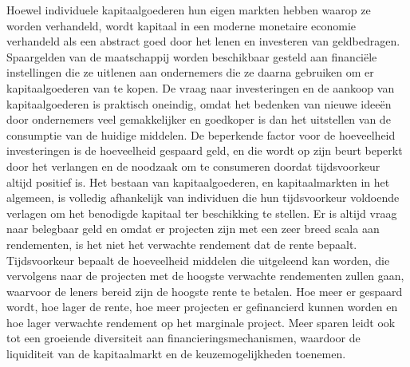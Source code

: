 Hoewel individuele kapitaalgoederen hun eigen markten hebben waarop ze worden verhandeld, wordt kapitaal in een moderne monetaire economie verhandeld als een abstract goed door het lenen en investeren van geldbedragen. Spaargelden van de maatschappij worden beschikbaar gesteld aan financiële instellingen die ze uitlenen aan ondernemers die ze daarna gebruiken om er kapitaalgoederen van te kopen. De vraag naar investeringen en de aankoop van kapitaalgoederen is praktisch oneindig, omdat het bedenken van nieuwe ideeën door ondernemers veel gemakkelijker en goedkoper is dan het uitstellen van de consumptie van de huidige middelen. De beperkende factor voor de hoeveelheid investeringen is de hoeveelheid gespaard geld, en die wordt op zijn beurt beperkt door het verlangen en de noodzaak om te consumeren doordat tijdsvoorkeur altijd positief is. Het bestaan van kapitaalgoederen, en kapitaalmarkten in het algemeen, is volledig afhankelijk van individuen die hun tijdsvoorkeur voldoende verlagen om het benodigde kapitaal ter beschikking te stellen. Er is altijd vraag naar belegbaar geld en omdat er projecten zijn met een zeer breed scala aan rendementen, is het niet het verwachte rendement dat de rente bepaalt. Tijdsvoorkeur bepaalt de hoeveelheid middelen die uitgeleend kan worden, die vervolgens naar de projecten met de hoogste verwachte rendementen zullen gaan, waarvoor de leners bereid zijn de hoogste rente te betalen. Hoe meer er gespaard wordt, hoe lager de rente, hoe meer projecten er gefinancierd kunnen worden en hoe lager verwachte  rendement op het marginale project. Meer sparen leidt ook tot een groeiende diversiteit aan financieringsmechanismen, waardoor de liquiditeit van de kapitaalmarkt en de keuzemogelijkheden toenemen.


